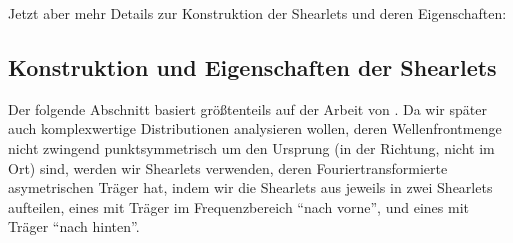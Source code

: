 Jetzt aber mehr Details zur Konstruktion der Shearlets und deren Eigenschaften:


\subsection{Konstruktion und Eigenschaften der Shearlets} %
\label{sec:konstruktion_und_eigenschaften_der_shearlets}

Der folgende Abschnitt basiert größtenteils auf der Arbeit von \textcite{Kutyniok2008}.
 Da wir später auch komplexwertige Distributionen analysieren wollen, deren Wellenfrontmenge nicht zwingend punktsymmetrisch um den Ursprung (in der Richtung, nicht im Ort) sind, werden wir Shearlets verwenden, deren Fouriertransformierte asymetrischen Träger hat, indem wir die Shearlets aus \cite{Kutyniok2008} jeweils in zwei Shearlets aufteilen, eines mit Träger im Frequenzbereich "`nach vorne"', und eines mit Träger "`nach hinten"'.

